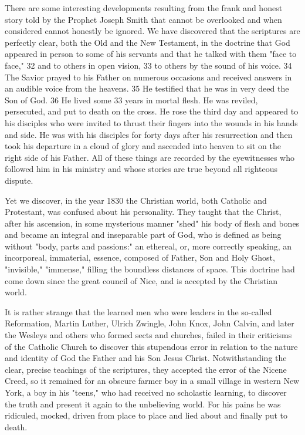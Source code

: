 There are some interesting developments resulting from the frank and honest story told by
the Prophet Joseph Smith that cannot be overlooked and when considered cannot honestly be
ignored. We have discovered that the scriptures are perfectly clear, both the Old and the New
Testament, in the doctrine that God appeared in person to some of his servants and that he
talked with them "face to face," 32 and to others in open vision, 33 to others by the sound of
his voice. 34 The Savior prayed to his Father on numerous occasions and received answers in
an audible voice from the heavens. 35 He testified that he was in very deed the Son of God.
36 He lived some 33 years in mortal flesh. He was reviled, persecuted, and put to death on
the cross. He rose the third day and appeared to his disciples who were invited to thrust their
fingers into the wounds in his hands and side. He was with his disciples for forty days after
his resurrection and then took his departure in a cloud of glory and ascended into heaven to
sit on the right side of his Father. All of these things are recorded by the eyewitnesses who
followed him in his ministry and whose stories are true beyond all righteous dispute.

Yet we discover, in the year 1830 the Christian world, both Catholic and Protestant, was
confused about his personality. They taught that the Christ, after his ascension, in some
mysterious manner "shed" his body of flesh and bones and became an integral and
inseparable part of God, who is defined as being without "body, parts and passions:" an
ethereal, or, more correctly speaking, an incorporeal, immaterial, essence, composed of
Father, Son and Holy Ghost, "invisible," "immense," filling the boundless distances of space.
This doctrine had come down since the great council of Nice, and is accepted by the
Christian world.

It is rather strange that the learned men who were leaders in the so-called Reformation,
Martin Luther, Ulrich Zwingle, John Knox, John Calvin, and later the Wesleys and others
who formed sects and churches, failed in their criticisms of the Catholic Church to discover
this stupendous error in relation to the nature and identity of God the Father and his Son
Jesus Christ. Notwithstanding the clear, precise teachings of the scriptures, they accepted the
error of the Nicene Creed, so it remained for an obscure farmer boy in a small village in
western New York, a boy in his "teens," who had received no scholastic learning, to discover
the truth and present it again to the unbelieving world. For his pains he was ridiculed,
mocked, driven from place to place and lied about and finally put to death.

